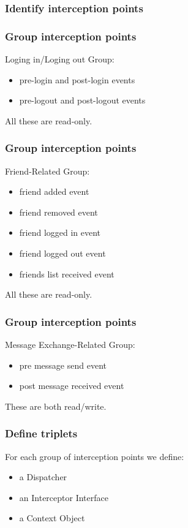 \documentclass{beamer}
\begin{document}
\begin{frame}
  \frametitle{Identify interception points}

  \begin{center}
  \end{center}

\end{frame}

\begin{frame}
  \frametitle{Group interception points}

  Loging in/Loging out Group:
  \begin{itemize}
  \item pre-login and post-login events
  \item pre-logout and post-logout events
  \end{itemize}
  All these are read-only.

\end{frame}

\begin{frame}
  \frametitle{Group interception points}

  Friend-Related Group:
  \begin{itemize}
  \item friend added event
  \item friend removed event
  \item friend logged in event
  \item friend logged out event
  \item friends list received event
  \end{itemize}
  All these are read-only.

\end{frame}

\begin{frame}
  \frametitle{Group interception points}

  Message Exchange-Related Group:
  \begin{itemize}
  \item pre message send event
  \item post message received event
  \end{itemize}
  These are both read/write.

\end{frame}

\begin{frame}
  \frametitle{Define triplets}

  For each group of interception points we define:
  \begin{itemize}
  \item a Dispatcher
  \item an Interceptor Interface
  \item a Context Object
  \end{itemize}

\end{frame}
\end{document}
